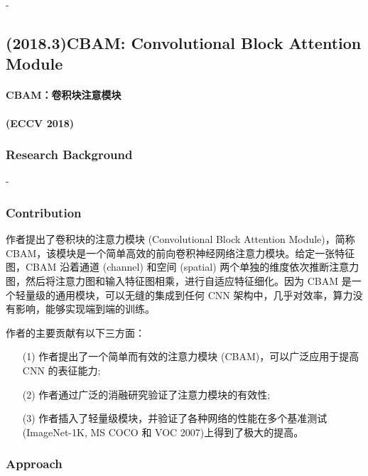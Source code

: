 \documentclass[a4paper]{ctexart}
\begin{document}
	-
	
	\subsection{(2018.3)CBAM: Convolutional Block Attention Module}
	
	\paragraph{CBAM：卷积块注意模块}
	
	\paragraph{(ECCV 2018)}
	
	\subsubsection{Research Background}
	
	-
	
	\subsubsection{Contribution}
	
	作者提出了卷积块的注意力模块 (Convolutional Block Attention Module)，简称 CBAM，该模块是一个简单高效的前向卷积神经网络注意力模块。给定一张特征图，CBAM 沿着通道 (channel) 和空间 (spatial) 两个单独的维度依次推断注意力图，然后将注意力图和输入特征图相乘，进行自适应特征细化。因为 CBAM 是一个轻量级的通用模块，可以无缝的集成到任何 CNN 架构中，几乎对效率，算力没有影响，能够实现端到端的训练。
	
	作者的主要贡献有以下三方面：
	
	\begin{itemize}
		\item[(1)] 
		作者提出了一个简单而有效的注意力模块 (CBAM)，可以广泛应用于提高 CNN 的表征能力;
		
		\item[(2)]
		作者通过广泛的消融研究验证了注意力模块的有效性;
		
		\item[(3)]
		作者插入了轻量级模块，并验证了各种网络的性能在多个基准测试(ImageNet-1K, MS COCO 和 VOC 2007)上得到了极大的提高。
		
	\end{itemize}	
	
	\subsubsection{Approach}
	
\end{document}
